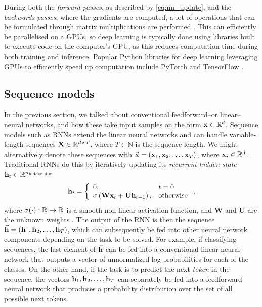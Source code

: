 \documentclass{statsmsc}
\begin{document}
{%
During both the \textit{forward passes}, as described by \cref{eq:nn_update}, and the
\textit{backwards passes}, where the gradients are computed, a lot of operations that can be
formulated through matrix multiplications are performed \citep{backprop}.
This can efficiently be parallelised on a \acp{GPU}, so deep learning is typically done using
libraries built to execute code on the computer's \ac{GPU}, as this reduces computation time
during both training and inference. Popular Python libraries for deep learning leveraging
\acp{GPU} to efficiently speed up computation include PyTorch \citep{pytorch} and TensorFlow \citep{tensorflow}.

\subsection{Sequence models}%
\label{sub:Sequence models}

In the previous section, we talked about conventional feedforward--or linear--neural networks,
and how these take input samples on the form $\mathbf{x} \in \mathbb{R}^d$. Sequence models such as
\acp{RNN} extend the linear neural networks and can handle variable-length sequences
$\mathbf{X} \in \mathbb{R}^{d \times T}$, where $T \in \mathbb{N}$ is the sequence length. We might alternatively
denote these sequences with $\vec{\mathbf{x}}=(\mathbf{x}_1,\mathbf{x}_2,\dots,\mathbf{x}_T)$, where $\mathbf{x}_i\in\mathbb{R}^d$.
Traditional \acp{RNN} do this by iteratively updating its \textit{recurrent hidden state} $\mathbf{h}_t \in
\mathbb{R}^{n_{\textrm{hidden dim} }}$
\begin{equation}\label{eq:rnn_trad}
    \mathbf{h}_t=
    \left\{
        \begin{array}{ll}
            0, & t=0 \\
            \sigma\left(\mathbf{W}\mathbf{x}_t + \mathbf{U}\mathbf{h}_{t-1} \right), & \textrm{otherwise}
        \end{array}
    \right.,
\end{equation}
where $\sigma(\cdot): \mathbb{R} \rightarrow {\mathbb{R}}$ is a smooth non-linear activation function,
and $\mathbf{W}$ and $\mathbf{U}$ are the unknown weights \citep{gru}.
The output of the \ac{RNN} is then the sequence
$\vec{\mathbf{h}}=\left(\mathbf{h}_1,\mathbf{h}_2,\dots,\mathbf{h}_T \right)$, which can subsequently be fed into other
neural network components depending on the task to be solved. For example, if
classifying sequences, the last element of $\vec{\mathbf{h}}$ can be fed into a conventional
linear neural network that outputs a vector of unnormalized log-probabilities for each of
the classes. On the other hand, if the task is to predict the next \textit{token} in the
sequence, the vectors $\mathbf{h}_1,\mathbf{h}_2,\dots,\mathbf{h}_T$ can separately be fed into a feedforward
neural network that produces a probability distribution over the set of all possible next tokens.

}
\end{document}
